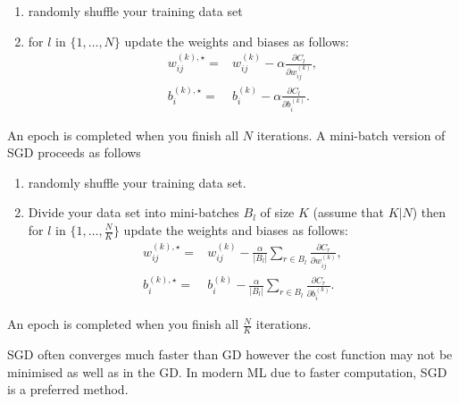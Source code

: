 \documentclass[12pt]{amsart}
\theoremstyle{remark}
\theoremstyle{definition}
\numberwithin{equation}{section}
\begin{document}
\begin{enumerate}
	\item randomly shuffle your training data set
	\item for $l$ in $\{1, \ldots, N\}$ update the weights and biases as follows:
	\begin{align*} 
	w_{ij}^{(k), \star} =& w_{ij}^{(k)} - \alpha \frac{\partial C_l}{ \partial w_{ij}^{(k)}},\\
	b_{i}^{(k), \star} =& b_{i}^{(k)} - \alpha \frac{\partial C_l}{ \partial b_{i}^{(k)}}.
	\end{align*}
\end{enumerate} 
An epoch is completed when you finish all $N$ iterations. A mini-batch version of SGD proceeds as follows
\begin{enumerate}
	\item randomly shuffle your training data set.
	\item Divide your data set into mini-batches $B_l$ of size $K$ (assume that $K|N$) then for $l$ in $\{1, \ldots, \tfrac{N}{K}\}$ update the weights and biases as follows:
	\begin{align*} 
	w_{ij}^{(k), \star} =& w_{ij}^{(k)} - \frac{\alpha}{|B_l|} \sum_{r \in B_l}  \frac{\partial C_r}{ \partial w_{ij}^{(k)}},\\
	b_{i}^{(k), \star} =& b_{i}^{(k)} -  \frac{\alpha}{|B_l|} \sum_{r \in B_l}   \frac{\partial C_r}{ \partial b_{i}^{(k)}}.
	\end{align*}
\end{enumerate} 
An epoch is completed when you finish all $\frac{N}{K}$ iterations. 

SGD often converges much faster than GD however the cost function may not be minimised as well as in the GD. In modern ML due to faster computation, SGD is a preferred method. 

{}

\end{document}
